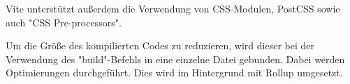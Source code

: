\label{sec:css-vite}

Vite unterstützt außerdem die Verwendung von CSS-Modulen, PostCSS sowie auch "CSS Pre-processors". \cite{ViteFeatures}

\label{sec:bundling-vite}

Um die Größe des kompilierten Codes zu reduzieren, wird dieser bei der Verwendung des "build"-Befehls in eine einzelne Datei gebunden. 
Dabei werden Optimierungen durchgeführt. Dies wird im Hintergrund mit Rollup \cite{Rollup} umgesetzt. 


    
    

